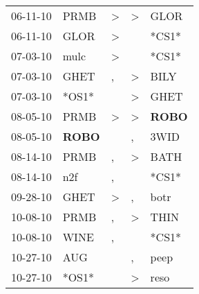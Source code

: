 \begin{supertabular}{p{0.07\textwidth}p{0.06\textwidth}p{0.02\textwidth}p{0.02\textwidth}p{0.06\textwidth}}
          06-11-10\textsuperscript{} &           PRMB\textsuperscript{} &     \textgreater &     \textgreater &           GLOR\textsuperscript{} \\
          06-11-10\textsuperscript{} &           GLOR\textsuperscript{} &     \textgreater &                  &                            *CS1* \\
          07-03-10\textsuperscript{} &           mulc\textsuperscript{} &     \textgreater &                  &                            *CS1* \\
          07-03-10\textsuperscript{} &           GHET\textsuperscript{} &                , &     \textgreater &           BILY\textsuperscript{} \\
          07-03-10\textsuperscript{} &                            *OS1* &                  &     \textgreater &           GHET\textsuperscript{} \\
          08-05-10\textsuperscript{} &           PRMB\textsuperscript{} &     \textgreater &     \textgreater &  \textbf{ROBO\textsuperscript{}} \\
          08-05-10\textsuperscript{} &  \textbf{ROBO\textsuperscript{}} &                  &                , &           3WID\textsuperscript{} \\
          08-14-10\textsuperscript{} &           PRMB\textsuperscript{} &                , &     \textgreater &           BATH\textsuperscript{} \\
          08-14-10\textsuperscript{} &            n2f\textsuperscript{} &                , &                  &                            *CS1* \\
          09-28-10\textsuperscript{} &           GHET\textsuperscript{} &     \textgreater &                , &           botr\textsuperscript{} \\
          10-08-10\textsuperscript{} &           PRMB\textsuperscript{} &                , &     \textgreater &           THIN\textsuperscript{} \\
          10-08-10\textsuperscript{} &           WINE\textsuperscript{} &                , &                  &                            *CS1* \\
          10-27-10\textsuperscript{} &            AUG\textsuperscript{} &                  &                , &           peep\textsuperscript{} \\
          10-27-10\textsuperscript{} &                            *OS1* &                  &     \textgreater &           reso\textsuperscript{} \\

\end{supertabular}
